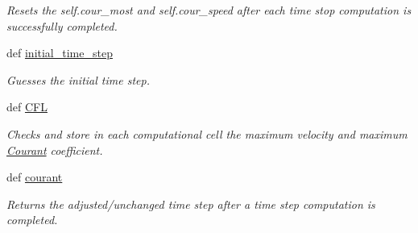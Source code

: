 \begin{DoxyCompactItemize}
\begin{DoxyCompactList}\small\item\em Resets the self.\-cour\-\_\-most and self.\-cour\-\_\-speed after each time stop computation is successfully completed. \end{DoxyCompactList}\item 
def \hyperlink{classmain__src_8old_1_1courant_1_1Courant_a5f7667f167dfa1cfbccf3ea84bd45954}{initial\-\_\-time\-\_\-step}
\begin{DoxyCompactList}\small\item\em Guesses the initial time step. \end{DoxyCompactList}\item 
\hypertarget{classmain__src_8old_1_1courant_1_1Courant_a89b1be1f2f7cdd9d99089eb4b71857a5}{def \hyperlink{classmain__src_8old_1_1courant_1_1Courant_a89b1be1f2f7cdd9d99089eb4b71857a5}{C\-F\-L}}\label{classmain__src_8old_1_1courant_1_1Courant_a89b1be1f2f7cdd9d99089eb4b71857a5}

\begin{DoxyCompactList}\small\item\em Checks and store in each computational cell the maximum velocity and maximum \hyperlink{classmain__src_8old_1_1courant_1_1Courant}{Courant} coefficient. \end{DoxyCompactList}\item 
def \hyperlink{classmain__src_8old_1_1courant_1_1Courant_a28824c2fa3ceba4c3f6f5a996a7acbf9}{courant}
\begin{DoxyCompactList}\small\item\em Returns the adjusted/unchanged time step after a time step computation is completed. \end{DoxyCompactList}\end{DoxyCompactItemize}

